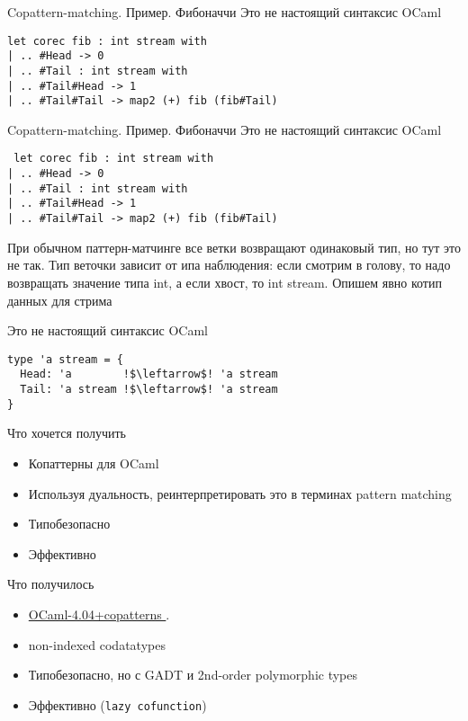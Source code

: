 \documentclass[10pt, mathserif]{beamer}
\theoremstyle{definition}
\begin{document}
\begin{frame}[fragile]{Copattern-matching. Пример. Фибоначчи}
Это не настоящий синтаксис OCaml
\begin{lstlisting}
let corec fib : int stream with
| .. #Head -> 0
| .. #Tail : int stream with
| .. #Tail#Head -> 1
| .. #Tail#Tail -> map2 (+) fib (fib#Tail)
\end{lstlisting}


\end{frame}
\begin{frame}[fragile]{Copattern-matching. Пример. Фибоначчи}
Это не настоящий синтаксис OCaml
\begin{lstlisting}
 let corec fib : int stream with
| .. #Head -> 0
| .. #Tail : int stream with
| .. #Tail#Head -> 1
| .. #Tail#Tail -> map2 (+) fib (fib#Tail)
\end{lstlisting}
При обычном паттерн-матчинге все ветки возвращают одинаковый тип, но тут это не так.
Тип веточки зависит от ипа наблюдения: если смотрим в голову, то надо возвращать значение
типа int, а если хвост, то int stream. Опишем явно котип данных для стрима

Это не настоящий синтаксис OCaml
\begin{lstlisting}
type 'a stream = {
  Head: 'a        !$\leftarrow$! 'a stream
  Tail: 'a stream !$\leftarrow$! 'a stream
}
\end{lstlisting}
\end{frame}

\begin{frame}[fragile]{Что хочется получить}
\begin{itemize}
 \item Копаттерны для OCaml
 \item Используя дуальность, реинтерпретировать это в терминах pattern matching
 \item Типобезопасно
 \item Эффективно
\end{itemize}
\end{frame}

\begin{frame}[fragile]{Что получилось}
\begin{itemize}
 \item \href{https://github.com/yurug/ocaml4.04.0-copatterns}{OCaml-4.04+copatterns \faGithub}.
 \item non-indexed codatatypes
 \item Типобезопасно, но с GADT и 2nd-order polymorphic types
 \item Эффективно (\lstinline=lazy cofunction=)
\end{itemize}
\end{frame}
\end{document}
